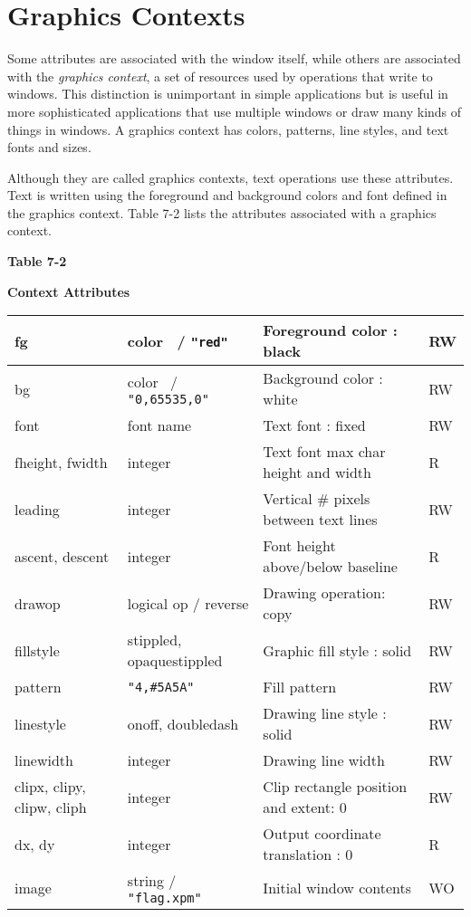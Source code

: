 \section{Graphics Contexts}

Some attributes are associated with the window itself, while others
are associated with the \textit{graphics context}, a set of resources
used by operations that write to windows. This distinction is
unimportant in simple applications but is useful in more sophisticated
applications that use multiple windows or draw many kinds of things in
windows. A graphics context has colors, patterns, line styles, and
text fonts and sizes.

Although they are called graphics contexts, text operations use these
attributes. Text is written using the foreground and background colors
and font defined in the graphics context. Table 7-2 lists the
attributes associated with a graphics context.

{\centering\sffamily\bfseries
Table 7-2
\par}

{\centering\sffamily\bfseries
Context Attributes
\par}

\begin{center}
\begin{xtabular}{|m{1.076in}|m{1.5in}|m{2.58in}|m{0.448in}|}
fg &
color \ / \texttt{"red"} &
Foreground color : black &
RW\\\hline
bg &
color \ / \texttt{"0,65535,0"} &
Background color : white &
RW\\\hline
font &
font name &
Text font : fixed &
RW\\\hline
fheight, fwidth &
integer &
Text font max char height and width &
R\\\hline
leading &
integer &
Vertical \# pixels between text lines &
RW\\\hline
ascent, descent &
integer &
Font height above/below baseline &
R\\\hline
drawop &
logical op / reverse  &
Drawing operation: copy &
RW\\\hline
fillstyle &
stippled, opaquestippled &
Graphic fill style : solid &
RW\\\hline
pattern &
\texttt{"4,\#5A5A"} &
Fill pattern &
RW\\\hline
linestyle &
onoff, doubledash &
Drawing line style : solid  &
RW\\\hline
linewidth &
integer &
Drawing line width &
RW\\\hline
clipx, clipy, clipw, cliph &
integer &
Clip rectangle position and extent: 0 &
RW\\\hline
dx, dy &
integer &
Output coordinate translation : 0 &
R\\\hline
image &
string / \texttt{"flag.xpm"} &
Initial window contents &
WO\\\hline
\end{xtabular}
\end{center}

